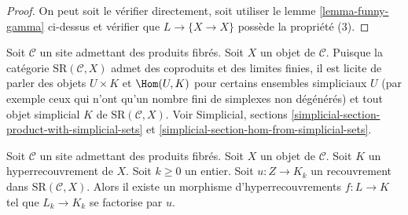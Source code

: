 \begin{proof}
On peut soit le vérifier directement, soit utiliser le
lemme \ref{lemma-funny-gamma} ci-dessus et vérifier que $L \to \{X \to X\}$
possède la propriété (3).
\end{proof}


\noindent
Soit $\mathcal{C}$ un site admettant des produits fibrés.
Soit $X$ un objet de $\mathcal{C}$.
Puisque la catégorie $\text{SR}(\mathcal{C}, X)$ admet des coproduits et des
limites finies, il est licite de parler des objets
$U \times K$ et $\Hom(U, K)$ pour certains ensembles simpliciaux $U$
(par exemple ceux qui n'ont qu'un nombre fini de simplexes non dégénérés)
et tout objet simplicial $K$ de $\text{SR}(\mathcal{C}, X)$.
Voir Simplicial, sections
\ref{simplicial-section-product-with-simplicial-sets} et
\ref{simplicial-section-hom-from-simplicial-sets}.

\begin{lemma}
\label{lemma-covering}
Soit $\mathcal{C}$ un site admettant des produits fibrés.
Soit $X$ un objet de $\mathcal{C}$.
Soit $K$ un hyperrecouvrement de $X$.
Soit $k \geq 0$ un entier.
Soit $u : Z \to K_k$ un recouvrement
dans $\text{SR}(\mathcal{C}, X)$.
Alors il existe un morphisme d'hyperrecouvrements
$f: L \to K$ tel que $L_k \to K_k$
se factorise par $u$.
\end{lemma}


